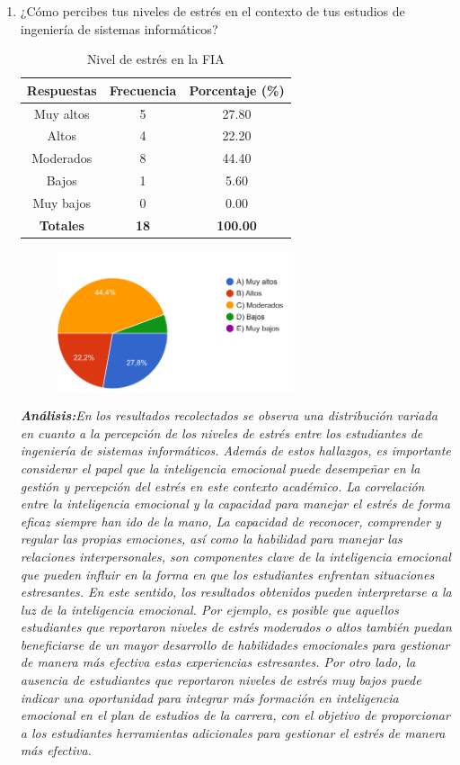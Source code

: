\documentclass[journal]{IEEEtran}
\begin{document}
\begin{enumerate}
\item¿Cómo percibes tus niveles de estrés en el contexto de tus estudios de ingeniería de sistemas informáticos?
	\begin{table}[H]
		\renewcommand{\arraystretch}{1.3}
		\centering
		\caption{Nivel de estrés en la FIA}
		\begin{tabular}{c c c}
			\hline
			\textbf{Respuestas} & \textbf{Frecuencia} & \textbf{Porcentaje (\%)}\\
			\hline
			Muy altos & 5 & 27.80 \\
			Altos & 4 & 22.20 \\
			Moderados & 8 & 44.40\\
			Bajos & 1 & 5.60\\
			Muy bajos & 0 & 0.00\\
			\hline
			\textbf{Totales} &\textbf{18}& \textbf{100.00}\\
			\hline
		\end{tabular}
	\end{table}
	\begin{figure}[h]
		\centering
		\includegraphics[width=07cm]{Pregunta11}
	\end{figure}
	\textit{\textbf{Análisis:}En los resultados recolectados se observa una distribución variada en cuanto a la percepción de los niveles de estrés entre los estudiantes de ingeniería de sistemas informáticos. Además de estos hallazgos, es importante considerar el papel que la inteligencia emocional puede desempeñar en la gestión y percepción del estrés en este contexto académico.
La correlación entre la inteligencia emocional y la capacidad para manejar el estrés de forma eficaz siempre han ido de la mano, La capacidad de reconocer, comprender y regular las propias emociones, así como la habilidad para manejar las relaciones interpersonales, son componentes clave de la inteligencia emocional que pueden influir en la forma en que los estudiantes enfrentan situaciones estresantes.
En este sentido, los resultados obtenidos pueden interpretarse a la luz de la inteligencia emocional. Por ejemplo, es posible que aquellos estudiantes que reportaron niveles de estrés moderados o altos también puedan beneficiarse de un mayor desarrollo de habilidades emocionales para gestionar de manera más efectiva estas experiencias estresantes. Por otro lado, la ausencia de estudiantes que reportaron niveles de estrés muy bajos puede indicar una oportunidad para integrar más formación en inteligencia emocional en el plan de estudios de la carrera, con el objetivo de proporcionar a los estudiantes herramientas adicionales para gestionar el estrés de manera más efectiva.
}\\


\end{enumerate}
\end{document}

